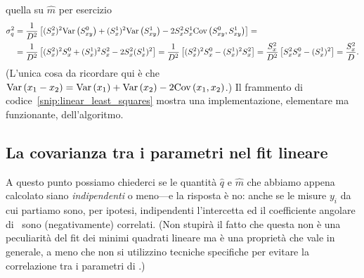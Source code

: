 quella su $\hat{m}$ per esercizio
\begin{align*}
  \sigma^2_q & = \frac{1}{D^2} \left[
    (S_x^2)^2\text{Var}\left(S_{xy}^0\right) + (S_x^1)^2\text{Var}\left(S_{xy}^1\right) -
    2S_x^2S_x^1\text{Cov}\left(S_{xy}^0, S_{xy}^1\right)
    \right] =\\
  & = \frac{1}{D^2} \left[
    (S_x^2)^2S_x^0 + (S_x^1)^2S_x^2 -
    2S_x^2(S_x^1)^2
    \right] =
  \frac{1}{D^2} \left[ (S_x^2)^2S_x^0 - (S_x^1)^2S_x^2 \right] =
  \frac{S_x^2}{D^2} \left[ S_x^2S_x^0 - (S_x^1)^2 \right] = \frac{S_x^2}{D}.
\end{align*}
(L'unica cosa da ricordare qui è che
$\text{Var}\left(x_1 - x_2\right) = \text{Var}\left(x_1\right) + \text{Var}\left(x_2\right) - 2\text{Cov}\left(x_1, x_2\right)$.)
Il frammento di codice~\ref{snip:linear_least_squares} mostra una
implementazione, elementare ma funzionante, dell'algoritmo.



\subsection{La covarianza tra i parametri nel fit lineare}

A questo punto possiamo chiederci se le quantità $\hat{q}$ e $\hat{m}$ che
abbiamo appena calcolato siano \emph{indipendenti} o meno---e la risposta è
no: anche se le misure $y_i$ da cui partiamo sono, per ipotesi, indipendenti
l'intercetta ed il coefficiente angolare di \bestfit\ sono (negativamente)
correlati. (Non stupirà il fatto che questa non è una peculiarità del
fit dei minimi quadrati lineare ma è una proprietà che vale in generale, a
meno che non si utilizzino tecniche specifiche per evitare la correlazione tra
i parametri di \bestfit.)

